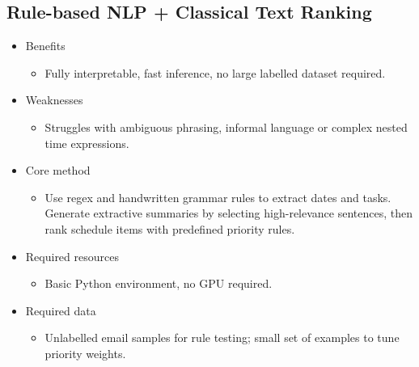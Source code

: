 \documentclass{article}
\begin{document}
\subsection{Rule-based NLP + Classical Text Ranking}
\begin{itemize}
  \item Benefits
    \begin{itemize}
      \item Fully interpretable, fast inference, no large labelled dataset required.
    \end{itemize}
  \item Weaknesses
    \begin{itemize}
      \item Struggles with ambiguous phrasing, informal language or complex nested time expressions.
    \end{itemize}
  \item Core method
    \begin{itemize}
      \item Use regex and handwritten grammar rules to extract dates and tasks. Generate extractive summaries by selecting high-relevance sentences, then rank schedule items with predefined priority rules.
    \end{itemize}
  \item Required resources
    \begin{itemize}
      \item Basic Python environment, no GPU required.
    \end{itemize}
  \item Required data
    \begin{itemize}
      \item Unlabelled email samples for rule testing; small set of examples to tune priority weights.
    \end{itemize}
\end{itemize}
\end{document}
